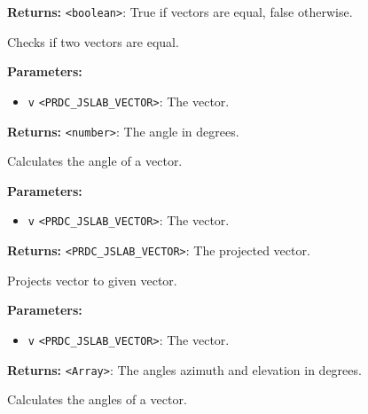 \documentclass[12pt,a4paper]{article}
\begin{document}
\noindent \textbf{Returns:} \texttt{<boolean>}: True if vectors are equal, false otherwise.

\noindent Checks if two vectors are equal.

\vspace{5mm}
\noindent {}


\noindent \textbf{Parameters:}
\begin{itemize}
  \item \texttt{v} \texttt{<PRDC\_JSLAB\_VECTOR>}: The vector.
\end{itemize}

\noindent \textbf{Returns:} \texttt{<number>}: The angle in degrees.

\noindent Calculates the angle of a vector.

\vspace{5mm}
\noindent {}


\noindent \textbf{Parameters:}
\begin{itemize}
  \item \texttt{v} \texttt{<PRDC\_JSLAB\_VECTOR>}: The vector.
\end{itemize}

\noindent \textbf{Returns:} \texttt{<PRDC\_JSLAB\_VECTOR>}: The projected vector.

\noindent Projects vector to given vector.

\vspace{5mm}
\noindent {}


\noindent \textbf{Parameters:}
\begin{itemize}
  \item \texttt{v} \texttt{<PRDC\_JSLAB\_VECTOR>}: The vector.
\end{itemize}

\noindent \textbf{Returns:} \texttt{<Array>}: The angles azimuth and elevation in degrees.

\noindent Calculates the angles of a vector.

\vspace{5mm}
\noindent {}
\end{document}
